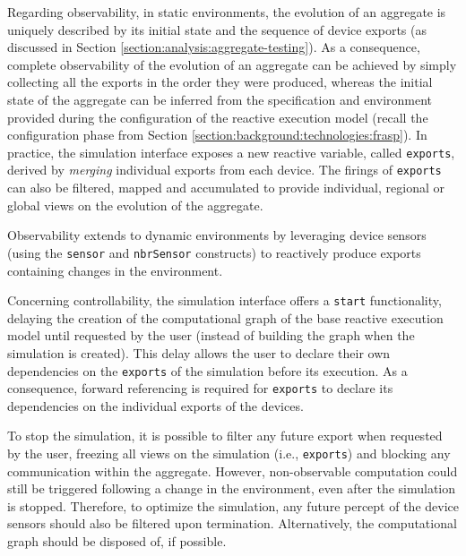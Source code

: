 Regarding observability, in static environments, the evolution of an aggregate
is uniquely described by its initial state and the sequence of device exports
(as discussed in Section \ref{section:analysis:aggregate-testing}). As a
consequence, complete observability of the evolution of an aggregate can be
achieved by simply collecting all the exports in the order they were produced,
whereas the initial state of the aggregate can be inferred from the
specification and environment provided during the configuration of the reactive
execution model (recall the configuration phase from Section
\ref{section:background:technologies:frasp}). In practice, the simulation
interface exposes a new reactive variable, called \texttt{exports}, derived by
\textit{merging} individual exports from each device. The firings of
\texttt{exports} can also be filtered, mapped and accumulated to provide
individual, regional or global views on the evolution of the aggregate.

Observability extends to dynamic environments by leveraging device sensors
(using the \texttt{sensor} and \texttt{nbrSensor} constructs) to reactively
produce exports containing changes in the environment.

Concerning controllability, the simulation interface offers a \texttt{start}
functionality, delaying the creation of the computational graph of the base
reactive execution model until requested by the user (instead of building the
graph when the simulation is created). This delay allows the user to declare
their own dependencies on the \texttt{exports} of the simulation before its
execution. As a consequence, forward referencing is required for
\texttt{exports} to declare its dependencies on the individual exports of the
devices.

To stop the simulation, it is possible to filter any future export when
requested by the user, freezing all views on the simulation (i.e.,
\texttt{exports}) and blocking any communication within the aggregate. However,
non-observable computation could still be triggered following a change in the
environment, even after the simulation is stopped. Therefore, to optimize the
simulation, any future percept of the device sensors should also be filtered
upon termination. Alternatively, the computational graph should be disposed of,
if possible.

